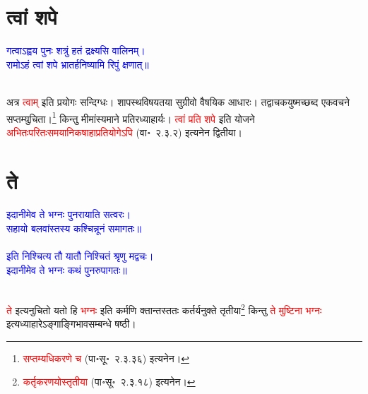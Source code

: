 \section[त्वां शपे]{त्वां शपे}
\centering\textcolor{blue}{गत्वाऽह्वय पुनः शत्रुं हतं द्रक्ष्यसि वालिनम्।\nopagebreak\\
रामोऽहं त्वां शपे भ्रातर्हनिष्यामि रिपुं क्षणात्॥}\nopagebreak\\
\\
\begin{sloppypar}\justifying\noindent\hspace{10mm} अत्र \textcolor{red}{त्वाम्‌} इति प्रयोगः सन्दिग्धः। शापस्थ\-विषयतया सुग्रीवो वैषयिक आधारः। तद्वाचक\-युष्मच्छब्द एक\-वचने सप्तम्युचिता।\footnote{\textcolor{red}{सप्तम्यधिकरणे च} (पा॰सू॰~२.३.३६) इत्यनेन।} किन्तु मीमांस्यमाने प्रतिरध्याहार्यः। \textcolor{red}{त्वां प्रति शपे} इति योजने \textcolor{red}{अभितः\-परितः\-समया\-निकषा\-हा\-प्रति\-योगेऽपि} (वा॰~२.३.२) इत्यनेन द्वितीया।\end{sloppypar}
\section[ते]{ते}
\centering\textcolor{blue}{इदानीमेव ते भग्नः पुनरायाति सत्वरः।\nopagebreak\\
सहायो बलवांस्तस्य कश्चिन्नूनं समागतः॥}\nopagebreak\\
\\
\centering\textcolor{blue}{इति निश्चित्य तौ यातौ निश्चितं श्रृणु मद्वचः।\nopagebreak\\
इदानीमेव ते भग्नः कथं पुनरुपागतः॥}\nopagebreak\\
\\
\begin{sloppypar}\justifying\noindent\hspace{10mm} \textcolor{red}{ते} इत्यनुचितो यतो हि \textcolor{red}{भग्नः} इति कर्मणि क्तान्तस्ततः कर्तर्यनुक्ते तृतीया\footnote{\textcolor{red}{कर्तृ\-करणयोस्तृतीया} (पा॰सू॰~२.३.१८) इत्यनेन।} किन्तु \textcolor{red}{ते मुष्टिना भग्नः} इत्यध्याहारेऽङ्गाङ्गि\-भाव\-सम्बन्धे षष्ठी।\end{sloppypar}

